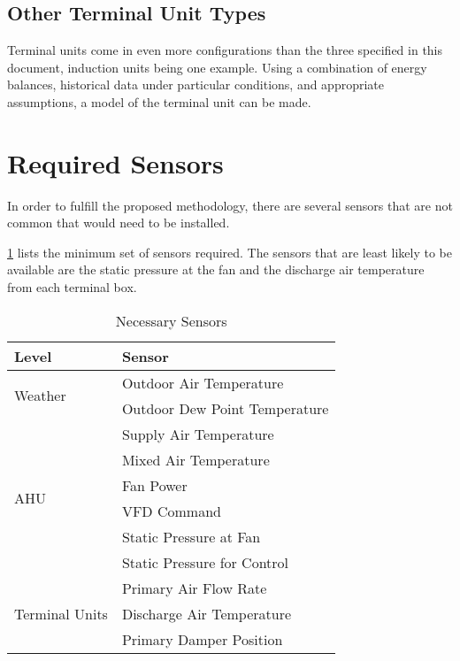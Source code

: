 \subsection{Other Terminal Unit Types}

Terminal units come in even more configurations than the three specified in this document, induction units being one example. Using a combination of energy balances, historical data under particular conditions, and appropriate assumptions, a model of the terminal unit can be made. 

\section{Required Sensors}

In order to fulfill the proposed methodology, there are several sensors that are not common that would need to be installed. 

\tableref{} \ref{tab:NecessarySensors} lists the minimum set of sensors required. The sensors that are least likely to be available are the static pressure at the fan and the discharge air temperature from each terminal box.

\begin{table}
\centering
\begin{tabular}{l l}
\toprule

Level & Sensor \\
\midrule\midrule
\multirow{2}{*}{Weather} & Outdoor Air Temperature \\
 & Outdoor Dew Point Temperature \\
 
 \midrule
 
 \multirow{6}{*}{AHU} & Supply Air Temperature \\
 & Mixed Air Temperature \\
 & Fan Power \\
 & VFD Command \\
 & Static Pressure at Fan \\
 & Static Pressure for Control \\
 
 
\midrule
\multirow{4}{*}{Terminal Units} & Primary Air Flow Rate \\
& Discharge Air Temperature \\
& Primary Damper Position \\

\bottomrule

\end{tabular}
\caption{Necessary Sensors}
\label{tab:NecessarySensors}
\end{table}

